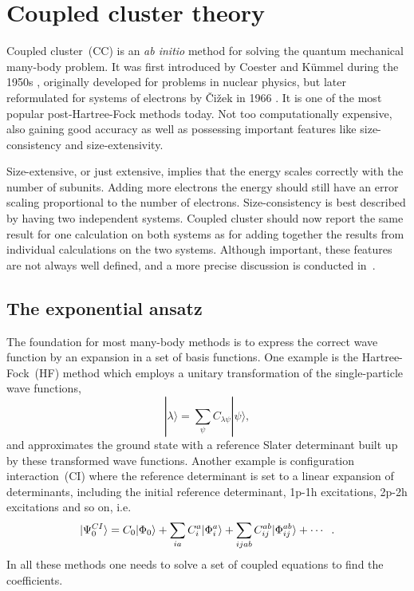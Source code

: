 \chapter{Coupled cluster theory}
\label{ch:CC}
Coupled cluster~(CC) is an \textit{ab initio} method for solving the quantum mechanical many-body problem.
It was first introduced by Coester and Kümmel during the 1950s \cite{NucPhys.7.421,NucPhys.17.477},
originally developed for problems in nuclear physics, but later reformulated for systems of electrons by \v{C}i\v{z}ek in 1966 \cite{ChemPhys.45.4256}.
It is one of the most popular post-Hartree-Fock methods today.
Not too computationally expensive, also gaining good accuracy as well as possessing important features like size-consistency and size-extensivity.

Size-extensive, or just extensive, implies that the energy scales correctly with the number of subunits.
Adding more electrons the energy should still have an error scaling proportional to the number of electrons.
Size-consistency is best described by having two independent systems. 
Coupled cluster should now report the same result for one calculation on both systems as for adding together the results from individual calculations on the two systems.
Although important, these features are not always well defined, and a more precise discussion is conducted in~\cite{shavitt2009many}.

\section{The exponential ansatz}
The foundation for most many-body methods is to express the correct wave function by an expansion in a set of basis functions. 
One example is the Hartree-Fock~(HF) method which employs a unitary transformation of the single-particle wave functions, 
\begin{equation}
|\lambda \rangle = \sum_{\psi} C_{\lambda \psi} |\psi \rangle ,
\end{equation}
and approximates the ground state with a reference Slater determinant built up by these transformed wave functions.
Another example is configuration interaction~(CI) where the reference determinant is set to a linear expansion of determinants, including the initial reference determinant, 1p-1h excitations, 2p-2h excitations and so on, i.e.
\begin{equation}
|\Psi_{0}^{CI} \rangle = C_0 |\Phi_0 \rangle + \sum_{ia} C_i^a |\Phi_i^a\rangle + \sum_{ijab} C_{ij}^{ab} |\Phi_{ij}^{ab} \rangle + \cdots \hspace{2mm}.
\end{equation}
In all these methods one needs to solve a set of coupled equations to find the coefficients.

